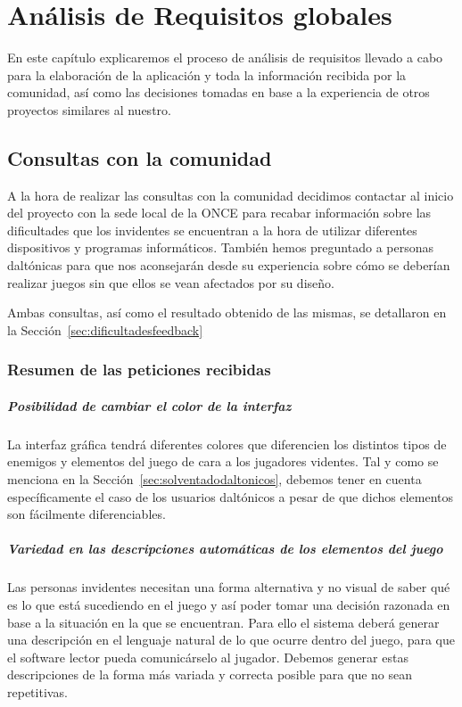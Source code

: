 \chapter[Análisis de Requisitos]{Análisis de Requisitos globales}

En este capítulo explicaremos el proceso de análisis de requisitos llevado a cabo para la elaboración de la aplicación y toda la información recibida por la comunidad, así como las decisiones tomadas en base a la experiencia de otros proyectos similares al nuestro.

\section{Consultas con la comunidad}

A la hora de realizar las consultas con la comunidad decidimos contactar al inicio del proyecto con la sede local de la ONCE para recabar información sobre las dificultades que los invidentes se encuentran a la hora de utilizar diferentes dispositivos y programas informáticos.
También hemos preguntado a personas daltónicas para que nos aconsejarán desde su experiencia sobre cómo se deberían realizar juegos sin que ellos se vean afectados por su diseño.

Ambas consultas, así como el resultado obtenido de las mismas, se detallaron en la Sección~\ref{sec:dificultadesfeedback} 

\subsection{Resumen de las peticiones recibidas}
	\paragraph{Posibilidad de cambiar el color de la interfaz} La interfaz gráfica tendrá diferentes colores que diferencien los distintos tipos de enemigos y elementos del juego de cara a los jugadores videntes. Tal y como se menciona en la Sección~\ref{sec:solventadodaltonicos}, debemos tener en cuenta específicamente el caso de los usuarios daltónicos a pesar de que dichos elementos son fácilmente diferenciables.
	\paragraph{Variedad en las descripciones automáticas de los elementos del juego} Las personas invidentes necesitan una forma alternativa y no visual de saber qué es lo que está sucediendo en el juego y así poder tomar una decisión razonada en base a la situación en la que se encuentran. Para ello el sistema deberá generar una descripción en el lenguaje natural de lo que ocurre dentro del juego, para que el software lector pueda comunicárselo al jugador. Debemos generar estas descripciones de la forma más variada y correcta posible para que no sean repetitivas. 
